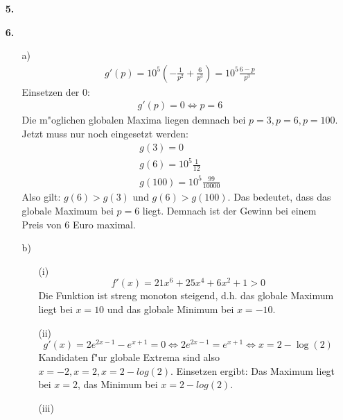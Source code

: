 \documentclass[a4paper,11pt]{article}
\begin{document}
\begin{enumerate}
        \item[\textbf{5.}]
            \todo

        \item[\textbf{6.}]
            \begin{enumerate}
                \item[a)]
                    \begin{align*}
                        g'(p)=10^5 \left( - \frac{1}{p^2} + \frac{6}{p^3} \right) = 10^5 \frac{6-p}{p^3}
                    \end{align*}
                    Einsetzen der 0:
                    \begin{align*}
                        g'(p)=0 \Leftrightarrow p=6
                    \end{align*}
                    Die m"oglichen globalen Maxima liegen demnach bei $ p=3, p=6, p=100 $. Jetzt muss nur noch eingesetzt werden:
                    \begin{align*}
                        g(3)=0 \\
                        g(6)=10^5 \frac{1}{12} \\
                        g(100)=10^5 \frac{99}{10000}
                    \end{align*}
                    Also gilt: $ g(6) > g(3) $ und $g(6)>g(100)$. Das bedeutet, dass das globale Maximum bei $p=6$ liegt.
                    Demnach ist der Gewinn bei einem Preis von 6 Euro maximal.
                \item[b)]
                    \begin{enumerate}
                        \item[(i)]
                            \[
                                f'(x)=21x^6 + 25x^4 + 6x^2 + 1 > 0
                            \]
                            Die Funktion ist streng monoton steigend, d.h. das globale Maximum liegt bei $x=10$ und das globale Minimum bei
                            $x=-10$.
                        \item[(ii)]
                            \[
                                g'(x)=2e^{2x-1}-e^{x+1}=0 \Leftrightarrow 2e^{2x-1} = e^{x+1} \Leftrightarrow x=2- \log(2)
                            \]
                            Kandidaten f"ur globale Extrema sind also $x=-2, x=2, x=2-log(2)$. Einsetzen ergibt:
                            Das Maximum liegt bei $x=2$, das Minimum bei $x=2-log(2)$.
                        \item[(iii)]

                    \end{enumerate}
            \end{enumerate}
    \end{enumerate}
\end{document}
